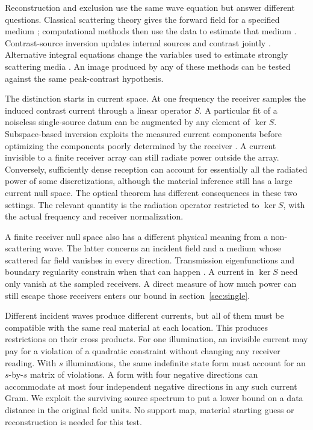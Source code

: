 \documentclass[anonymous,12pt]{iopjournal}
\theoremstyle{remark}\newtheorem{remark}[theorem]{Remark}
\numberwithin{equation}{section}
\begin{document}
Reconstruction and exclusion use the same wave equation but answer different questions. Classical scattering theory gives the forward field for a specified medium \cite{colton}; computational methods then use the data to estimate that medium \cite{chenbook}. Contrast-source inversion updates internal sources and contrast jointly \cite{csi}. Alternative integral equations change the variables used to estimate strongly scattering media \cite{nie,cie}. An image produced by any of these methods can be tested against the same peak-contrast hypothesis.

The distinction starts in current space. At one frequency the receiver samples the induced contrast current through a linear operator $S$. A particular fit of a noiseless single-source datum can be augmented by any element of $\ker S$. Subspace-based inversion exploits the measured current components before optimizing the components poorly determined by the receiver \cite{chen,zhong}. A current invisible to a finite receiver array can still radiate power outside the array. Conversely, sufficiently dense reception can account for essentially all the radiated power of some discretizations, although the material inference still has a large current null space. The optical theorem has different consequences in these two settings. The relevant quantity is the radiation operator restricted to $\ker S$, with the actual frequency and receiver normalization.

A finite receiver null space also has a different physical meaning from a non-scattering wave. The latter concerns an incident field and a medium whose scattered far field vanishes in every direction. Transmission eigenfunctions and boundary regularity constrain when that can happen \cite{cakoni_book,cakoni_vogelius}. A current in $\ker S$ need only vanish at the sampled receivers. A direct measure of how much power can still escape those receivers enters our bound in section~\ref{sec:single}.

Different incident waves produce different currents, but all of them must be compatible with the same real material at each location. This produces restrictions on their cross products. For one illumination, an invisible current may pay for a violation of a quadratic constraint without changing any receiver reading. With $s$ illuminations, the same indefinite state form must account for an $s$-by-$s$ matrix of violations. A form with four negative directions can accommodate at most four independent negative directions in any such current Gram. We exploit the surviving source spectrum to put a lower bound on a data distance in the original field units. No support map, material starting guess or reconstruction is needed for this test.
\end{document}

